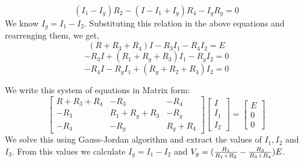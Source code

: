 \documentclass{article}
\begin{document}
\begin{equation}
(I_1-I_g)R_2-(I-I_1+I_g)R_4-I_gR_g=0
\end{equation}
We know $I_g=I_1-I_2$.  Substituting this relation in the above equations and rearrenging them, we get,
\begin{equation}
(R+R_3+R_4)I-R_3I_1-R_4I_2=E
\end{equation}
\begin{equation}
-R_3I+(R_1+R_g+R_3)I_1-R_gI_2=0
\end{equation}
\begin{equation}
-R_4I-R_gI_1+(R_g+R_2+R_4)I_2=0
\end{equation}

We write this system of equations in Matrix form: \\
\begin{equation}
\begin{bmatrix}
R+R_3+R_4 & -R_3 & -R_4 \\
-R_3 & R_1+R_g+R_3 & -R_g \\
-R_4 & -R_g & R_g+R_4
\end{bmatrix}
\begin{bmatrix}
I \\
I_1 \\
I_2
\end{bmatrix}
=
\begin{bmatrix}
E \\
0 \\
0
\end{bmatrix}
\end{equation}
We solve this using Gauss-Jordan algorithm and extract the values of $I_1, I_2$ and $I_3$. From this values we calculate $I_g=I_1-I_2$ and $V_g=({R_1 \over{R_1+R_2}}-{R_3 \over{R_3+R_4}})E$.
\end{document}
